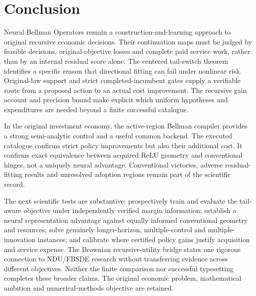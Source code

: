\section{Conclusion}\label{sec:conclusion109}
Neural Bellman Operators remain a construction-and-learning approach to original recursive economic decisions. Their continuation maps must be judged by feasible decisions, original-objective losses and complete paid service work, rather than by an internal residual score alone. The centered tail-switch theorem identifies a specific reason that directional fitting can fail under nonlinear risk. Original-law support and strict completed-incumbent gates supply a verifiable route from a proposed action to an actual cost improvement. The recursive gain account and precision bound make explicit which uniform hypotheses and expenditures are needed beyond a finite successful catalogue.

In the original investment economy, the active-region Bellman compiler provides a strong semi-analytic control and a useful common backend. The executed catalogue confirms strict policy improvements but also their additional cost. It confirms exact equivalence between acquired ReLU geometry and conventional hinges, not a uniquely neural advantage. Conventional victories, adverse residual-fitting results and unresolved adoption regions remain part of the scientific record.

The next scientific tests are substantive: prospectively train and evaluate the tail-aware objective under independently verified margin information; establish a neural representation advantage against equally informed conventional geometry and resources; solve genuinely longer-horizon, multiple-control and multiple-innovation instances; and calibrate where certified policy gains justify acquisition and service expense. The Brownian recursive-utility bridge states one rigorous connection to NDU/FBSDE research without transferring evidence across different objectives. Neither the finite comparison nor successful typesetting completes these broader claims. The original economic problem, mathematical ambition and numerical-methods objective are retained.

